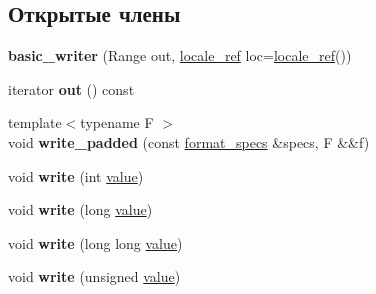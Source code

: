 \subsection*{Открытые члены}
\begin{DoxyCompactItemize}
\item 
\mbox{\label{classinternal_1_1basic__writer_a4dc1363cc8a4621a35b245401578a823}} 
{\bfseries basic\+\_\+writer} (Range out, \hyperlink{classinternal_1_1locale__ref}{locale\+\_\+ref} loc=\hyperlink{classinternal_1_1locale__ref}{locale\+\_\+ref}())
\item 
\mbox{\label{classinternal_1_1basic__writer_a07cc1d3e61faaa752066df1b1567eb43}} 
iterator {\bfseries out} () const
\item 
\mbox{\label{classinternal_1_1basic__writer_a3c01b55de87509f86518589f587948b8}} 
{\footnotesize template$<$typename F $>$ }\\void {\bfseries write\+\_\+padded} (const \hyperlink{structbasic__format__specs}{format\+\_\+specs} \&specs, F \&\&f)
\item 
\mbox{\label{classinternal_1_1basic__writer_aecda8776db4b19a8deb22c3f7c9bc73c}} 
void {\bfseries write} (int \hyperlink{classinternal_1_1value}{value})
\item 
\mbox{\label{classinternal_1_1basic__writer_af65494ccebb9e726de34e2852b9e851a}} 
void {\bfseries write} (long \hyperlink{classinternal_1_1value}{value})
\item 
\mbox{\label{classinternal_1_1basic__writer_ac65beb55d51f49ea07578b05b5ef9ff5}} 
void {\bfseries write} (long long \hyperlink{classinternal_1_1value}{value})
\item 
\mbox{\label{classinternal_1_1basic__writer_a975b9d677f59f30790d432c359e129e8}} 
void {\bfseries write} (unsigned \hyperlink{classinternal_1_1value}{value})
\item 
\mbox{\label{classinternal_1_1basic__writer_ad796ac02a7a010afbbf24a79af4416bc}} 

\end{DoxyCompactItemize}
